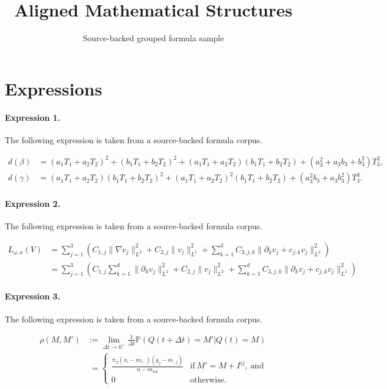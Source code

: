 \documentclass[11pt]{article}
\title{Aligned Mathematical Structures}
\author{Source-backed grouped formula sample}
\date{}
\begin{document}
\maketitle
\section{Expressions}
\paragraph{Expression 1.} The following expression is taken from a source-backed formula corpus.

\begin{align*}d(\beta) &=\left(a_1T_1+a_2T_2 \right)^2 + \left(b_1T_1+b_2T_2 \right)^2+\left(a_1T_1+a_2T_2 \right) \left(b_1T_1+b_2T_2 \right) + (a_3^2+a_3b_3+b_3^2)T_3^2,\\d(\gamma)&=\left(a_1T_1+a_2T_2 \right) \left( b_1T_1+b_2T_2 \right)^2 +\left(a_1T_1+a_2T_2 \right)^2 \left( b_1T_1+b_2T_2 \right) + (a_3^2b_3+a_3b_3^2)T_3^3.\end{align*}

\paragraph{Expression 2.} The following expression is taken from a source-backed formula corpus.

\begin{align*}L_{\omega,\mathbf{c}}(V)&=\sum_{j=1}^3\left(C_{1,j}\|\nabla v_j\|_{L^2}^2+C_{2,j}\|v_j\|_{L^2}^2+\sum_{k=1}^dC_{3,j,k}\|\partial_kv_j+c_{j,k}v_j\|_{L^2}^2\right)\\&=\sum_{j=1}^3\left(C_{1,j}\sum_{k=1}^d\|\partial_k v_j\|_{L^2}^2+C_{2,j}\|v_j\|_{L^2}^2+\sum_{k=1}^dC_{3,j,k}\|\partial_kv_j+c_{j,k}v_j\|_{L^2}^2\right)\end{align*}

\paragraph{Expression 3.} The following expression is taken from a source-backed formula corpus.

\begin{align*}\rho(M,M') &:= \lim_{\Delta t\to 0^+}\frac1{\Delta t}\mathbb{P}\left(\left.Q(t+\Delta t) = M'\right|Q(t) = M\right)\\&\; = \left\{\begin{array}{ll}\frac{\pi_{ij}\left(x_i - m_{i,\cdot}\right)\left(y_j - m_{\cdot,j}\right)}{n - m_{tot}}&\text{if}\ M' = M+I^{ij},\ \text{and}\\ 0 & \text{otherwise}.\end{array}\right.\end{align*}
\end{document}
